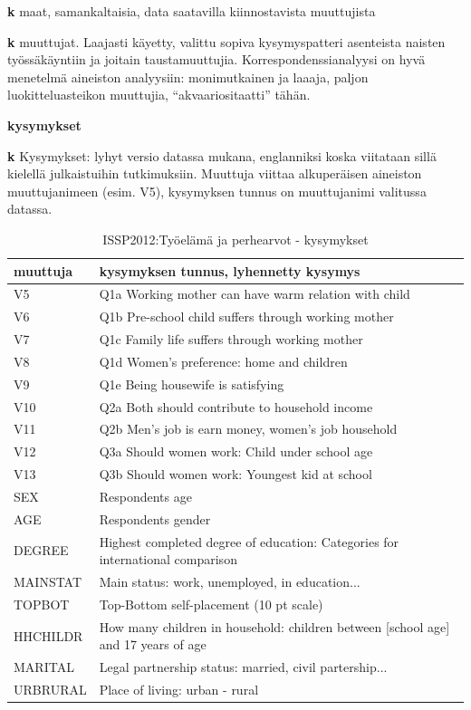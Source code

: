 \documentclass[
  finnish,
]{book}
\begin{document}
\textbf{k} maat, samankaltaisia, data saatavilla kiinnostavista muuttujista

\textbf{k} muuttujat. Laajasti käyetty, valittu sopiva kysymyspatteri asenteista naisten
työssäkäyntiin ja joitain taustamuuttujia. Korrespondenssianalyysi on hyvä menetelmä
aineiston analyysiin: monimutkainen ja laaaja, paljon luokitteluasteikon muuttujia,
``akvaariositaatti'' tähän.

\textbf{kysymykset}

\textbf{k} Kysymykset: lyhyt versio datassa mukana, englanniksi koska viitataan sillä
kielellä julkaistuihin tutkimuksiin. Muuttuja viittaa alkuperäisen aineiston
muuttujanimeen (esim. V5), kysymyksen tunnus on muuttujanimi valitussa datassa.

\begin{table}

\caption{\label{tab:vartable1}ISSP2012:Työelämä ja perhearvot - kysymykset}
\centering
\begin{tabular}[t]{ll}
\toprule
muuttuja & kysymyksen tunnus, lyhennetty kysymys\\
\midrule
V5 & Q1a Working mother can have warm relation with child\\
V6 & Q1b Pre-school child suffers through working mother\\
V7 & Q1c Family life suffers through working mother\\
V8 & Q1d Women’s preference: home and children\\
V9 & Q1e Being housewife is satisfying\\
\addlinespace
V10 & Q2a Both should contribute to household income\\
V11 & Q2b Men’s job is earn money, women’s job household\\
V12 & Q3a Should women work: Child under school age\\
V13 & Q3b Should women work: Youngest kid at school\\
SEX & Respondents age\\
\addlinespace
AGE & Respondents gender\\
DEGREE & Highest completed degree of education: Categories for international comparison\\
MAINSTAT & Main status: work, unemployed, in education...\\
TOPBOT & Top-Bottom self-placement (10 pt scale)\\
HHCHILDR & How many children in household: children between [school age] and 17 years of age\\
\addlinespace
MARITAL & Legal partnership status: married, civil partership...\\
URBRURAL & Place of living: urban - rural\\
\bottomrule
\end{tabular}
\end{table}
\end{document}
